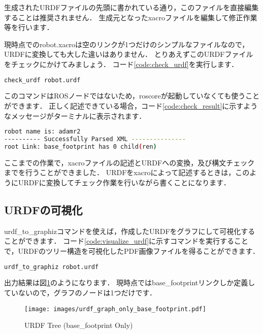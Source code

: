\documentclass[{../../master}]{subfiles}
\begin{document}
生成されたURDFファイルの先頭に書かれている通り，このファイルを直接編集することは推奨されません．
生成元となった\textsf{xacro}ファイルを編集して修正作業等を行います．

現時点での\textsf{robot.xacro}は空のリンクが1つだけのシンプルなファイルなので，URDFに変換しても大した違いはありません．
とりあえずこのURDFファイルをチェックにかけてみましょう．
コード\ref{code:check_urdf}を実行します．

\begin{lstlisting}[language=sh, caption=Check URDF, label=code:check_urdf]
check_urdf robot.urdf
\end{lstlisting}

このコマンドはROSノードではないため，\textsf{roscore}が起動していなくても使うことができます．
正しく記述できている場合，コード\ref{code:check_result}に示すようなメッセージがターミナルに表示されます．

\begin{lstlisting}[language=sh, caption=Check Result, label=code:check_result]
robot name is: adamr2
---------- Successfully Parsed XML ---------------
root Link: base_footprint has 0 child(ren)
\end{lstlisting}

ここまでの作業で，\textsf{xacro}ファイルの記述とURDFへの変換，及び構文チェックまでを行うことができました．
URDFを\textsf{xacro}によって記述するときは，このようにURDFに変換してチェック作業を行いながら書くことになります．

\subsection{URDFの可視化}

\textsf{urdf\_to\_graphiz}コマンドを使えば，作成したURDFをグラフにして可視化することができます．
コード\ref{code:visualize_urdf}に示すコマンドを実行することで，URDFのツリー構造を可視化したPDF画像ファイルを得ることができます．

\begin{lstlisting}[language=sh, caption=Visualize URDF Tree, label=code:visualize_urdf]
urdf_to_graphiz robot.urdf
\end{lstlisting}

出力結果は図\ref{fig:urdf_graph_only_base_footprint}のようになります．
現時点では\textsf{base\_footprint}リンクしか定義していないので，グラフのノードは1つだけです．

\begin{figure}[ht]
  \centering
  \texttt{[image: images/urdf\_graph\_only\_base\_footprint.pdf]}
  \caption{URDF Tree (\textsf{base\_footprint} Only)}
  \label{fig:urdf_graph_only_base_footprint}
\end{figure}
\end{document}
